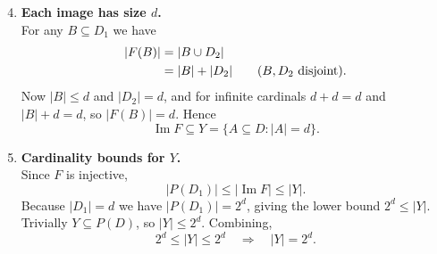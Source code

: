 \documentclass[12pt]{article}
\theoremstyle{definition} %
\theoremstyle{plain} %
\begin{document}
\begin{enumerate}
    \setcounter{enumi}{3}  %
    \item \textbf{Each image has size $d$.}\\
          For any $B\subseteq D_{1}$ we have
          \begin{align}
              |F(B)| &= |B\cup D_{2}| \\
                     &= |B| + |D_{2}| \tag{$B,D_{2}$ disjoint}.
          \end{align}
          Now $|B|\le d$ and $|D_{2}|=d$, and for infinite cardinals
          $d+d=d$ and $|B|+d=d$, so $|F(B)|=d$.  Hence
          \[
              \operatorname{Im}F \subseteq
              Y=\{A\subseteq D : |A|=d\}.
          \]

    \item \textbf{Cardinality bounds for $Y$.}\\
          Since $F$ is injective,
          \[
              |P(D_{1})| \le |\operatorname{Im}F| \le |Y|.
          \]
          Because $|D_{1}|=d$ we have $|P(D_{1})|=2^{d}$, giving the lower
          bound $2^{d}\le |Y|$.  Trivially $Y\subseteq P(D)$, so
          $|Y|\le 2^{d}$.  Combining,
          \[
              2^{d}\le |Y|\le 2^{d}\quad\Longrightarrow\quad |Y|=2^{d}.
          \]
          \qedhere
\end{enumerate}
\end{document}
